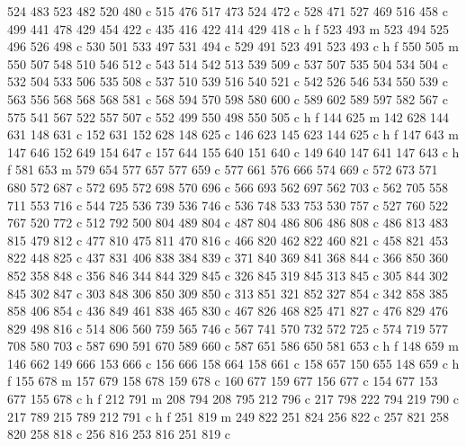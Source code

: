 {{        524 483 523 482 520 480 c
        515 476 517 473 524 472 c
        528 471 527 469 516 458 c
        499 441 478 429 454 422 c
        435 416 422 414 429 418 c
        h f
        523 493 m
        523 494 525 496 526 498 c
        530 501 533 497 531 494 c
        529 491 523 491 523 493 c
        h f
        550 505 m
        550 507 548 510 546 512 c
        543 514 542 513 539 509 c
        537 507 535 504 534 504 c
        532 504 533 506 535 508 c
        537 510 539 516 540 521 c
        542 526 546 534 550 539 c
        563 556 568 568 568 581 c
        568 594 570 598 580 600 c
        589 602 589 597 582 567 c
        575 541 567 522 557 507 c
        552 499 550 498 550 505 c
        h f
        144 625 m
        142 628 144 631 148 631 c
        152 631 152 628 148 625 c
        146 623 145 623 144 625 c
        h f
        147 643 m
        147 646 152 649 154 647 c
        157 644 155 640 151 640 c
        149 640 147 641 147 643 c
        h f
        581 653 m
        579 654 577 657 577 659 c
        577 661 576 666 574 669 c
        572 673 571 680 572 687 c
        572 695 572 698 570 696 c
        566 693 562 697 562 703 c
        562 705 558 711 553 716 c
        544 725 536 739 536 746 c
        536 748 533 753 530 757 c
        527 760 522 767 520 772 c
        512 792 500 804 489 804 c
        487 804 486 806 486 808 c
        486 813 483 815 479 812 c
        477 810 475 811 470 816 c
        466 820 462 822 460 821 c
        458 821 453 822 448 825 c
        437 831 406 838 384 839 c
        371 840 369 841 368 844 c
        366 850 360 852 358 848 c
        356 846 344 844 329 845 c
        326 845 319 845 313 845 c
        305 844 302 845 302 847 c
        303 848 306 850 309 850 c
        313 851 321 852 327 854 c
        342 858 385 858 406 854 c
        436 849 461 838 465 830 c
        467 826 468 825 471 827 c
        476 829 476 829 498 816 c
        514 806 560 759 565 746 c
        567 741 570 732 572 725 c
        574 719 577 708 580 703 c
        587 690 591 670 589 660 c
        587 651 586 650 581 653 c
        h f
        148 659 m
        146 662 149 666 153 666 c
        156 666 158 664 158 661 c
        158 657 150 655 148 659 c
        h f
        155 678 m
        157 679 158 678 159 678 c
        160 677 159 677 156 677 c
        154 677 153 677 155 678 c
        h f
        212 791 m
        208 794 208 795 212 796 c
        217 798 222 794 219 790 c
        217 789 215 789 212 791 c
        h f
        251 819 m
        249 822 251 824 256 822 c
        257 821 258 820 258 818 c
        256 816 253 816 251 819 c
}}
